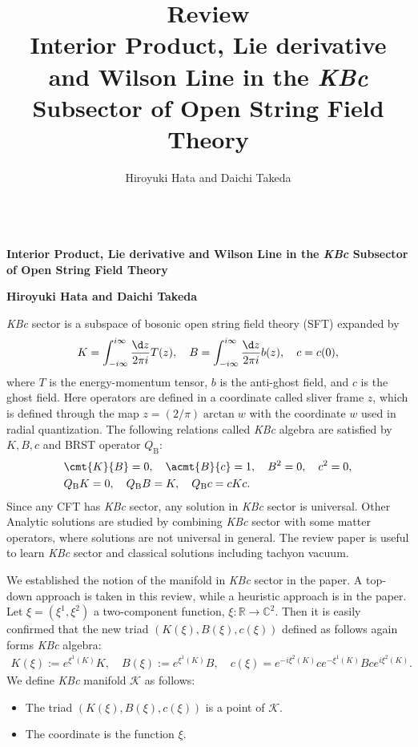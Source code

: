 \documentclass[12pt]{article}
\title{\textbf{Review}\\
Interior Product, Lie derivative and Wilson Line in the \textit{KBc} Subsector of Open String Field Theory
}
\author{Hiroyuki Hata and Daichi Takeda}
\date{}
\renewcommand{\thefootnote}{\fnsymbol{footnote}}
\begin{document}
{\Large{}\\[2mm]
\textbf{Interior Product, Lie derivative and Wilson Line in the \textit{KBc} Subsector of Open String Field Theory
}
}

\noindent
\hfill\textbf{Hiroyuki Hata and Daichi Takeda}

\renewcommand{\thefootnote}{\arabic{footnote})}
\setcounter{footnote}{0}
\vspace{12pt}
\textit{KBc} sector is a subspace of bosonic open string field theory (SFT) expanded by
\begin{align}
	K = \int_{-i\infty}^{i\infty}\frac{\d z}{2\pi i}T(z),\quad
	B =  \int_{-i\infty}^{i\infty}\frac{\d z}{2\pi i}b(z),\quad 
	c = c(0),
\end{align}
where $T$ is the energy-momentum tensor, $b$ is the anti-ghost field, and $c$ is the ghost field.
Here operators are defined in a coordinate called sliver frame $z$, 
which is defined through the map $z = (2/\pi)\arctan w$ with the coordinate $w$ used in radial quantization.
The following relations called \textit{KBc} algebra are satisfied by $K,B,c$ and BRST operator $Q_\mathrm{B}$:
\begin{align}
	&\cmt{K}{B} = 0,\quad
	\acmt{B}{c} = 1,\quad
	B^2 = 0,\quad
	c^2 = 0,\\
	&Q_\mathrm{B}K = 0,\quad
	Q_\mathrm{B}B = K,\quad
	Q_\mathrm{B}c = cKc.
\end{align}
Since any CFT has \textit{KBc} sector, any solution in \textit{KBc} sector is universal.
Other Analytic solutions are studied by combining \textit{KBc} sector with some matter operators,
where solutions are not universal in general.
The review paper \cite{Okawa:2012ica} is useful to learn \textit{KBc} sector and classical solutions including tachyon vacuum.

We established the notion of the manifold in \textit{KBc} sector in the paper.
A top-down approach is taken in this review, while a heuristic approach is in the paper.
Let $\xi = (\xi^1,\xi^2)$ a two-component function, $\xi:\mathbb R\to \mathbb C^2$.
Then it is easily confirmed that the new triad $(K(\xi),B(\xi),c(\xi))$ defined as follows again forms \textit{KBc} algebra:
\begin{align}
	K(\xi) := e^{\xi^1(K)}K,\quad B(\xi) := e^{\xi^1(K)}B,\quad c(\xi) = e^{-i\xi^2(K)}ce^{-\xi^1(K)}Bce^{i\xi^2(K)}.
\end{align}
We define \textit{KBc} manifold $\mathcal K$ as follows:
\begin{itemize}
	\item The triad $(K(\xi),B(\xi),c(\xi))$ is a point of $\mathcal K$.
	\item The coordinate is the function $\xi$.
\end{itemize}
\end{document}
